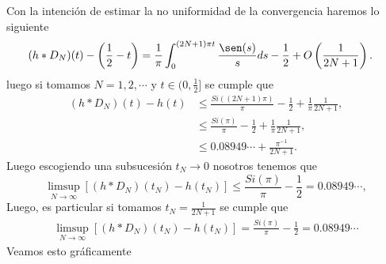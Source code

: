 Con la intención de estimar la no uniformidad de la convergencia haremos lo siguiente
\begin{align*}
  (h*D_N)(t)-\left( \frac{1}{2}-t \right)&=\frac{1}{\pi}\int_{0}^{(2N+1)\pi t}\frac{\sen(s)}{s}ds-\frac{1}{2}+O\left( \frac{1}{2N+1} \right).
\end{align*}
luego si tomamos $N=1,2,\cdots$ y $t\in (0,\frac{1}{2}]$ se cumple que
\begin{align*}
  (h*D_N)(t)-h(t)&\leq \frac{Si((2N+1)\pi)}{\pi}-\frac{1}{2}+\frac{1}{\pi}\frac{1}{2N+1},\\
  &\leq \frac{Si(\pi)}{\pi}-\frac{1}{2}+\frac{1}{\pi}\frac{1}{2N+1},\\
  &\leq 0.08949\cdots+\frac{\pi^{-1}}{2N+1}.
\end{align*}
Luego escogiendo una subsucesión $t_N\to 0$ nosotros tenemos que
\begin{equation}\label{eq:cota}
  \limsup_{N\to\infty}\left[ (h*D_{N})(t_{N})-h(t_{N}) \right]\leq \frac{Si(\pi)}{\pi}-\frac{1}{2}=0.08949\cdots,
\end{equation}
Luego, es particular si tomamos $t_N=\frac{1}{2N+1}$ se cumple que
\begin{align*}
  \limsup_{N\to\infty}\left[ (h*D_{N})(t_N)-h(t_{N}) \right]=\frac{Si(\pi)}{\pi}-\frac{1}{2}=0.08949\cdots
\end{align*}
Veamos esto gráficamente
